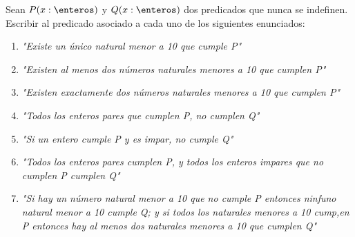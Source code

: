 \begin{enunciado}{\ejercicio}
  Sean $P(x:\enteros)$ y $Q(x: \enteros)$ dos predicados que nunca se indefinen. Escribir al predicado asociado
  a cada uno de los siguientes enunciados:
  \begin{enumerate}[label=\tiny\faIcon{yin-yang}$_{\arabic*}$]
    \item \textit{"Existe un único natural menor a 10 que cumple P"}
    \item \textit{"Existen al menos dos números naturales menores a 10 que cumplen P"}
    \item \textit{"Existen exactamente dos números naturales menores a 10 que cumplen P"}
    \item \textit{"Todos los enteros pares que cumplen P, no cumplen Q"}
    \item \textit{"Si un entero cumple P y es impar, no cumple Q"}
    \item \textit{"Todos los enteros pares cumplen P, y todos los enteros impares que no cumplen P cumplen Q"}
    \item \textit{"Si hay un número natural menor a 10 que no cumple P entonces ninfuno natural menor a 10 cumple Q; y si todos los
            naturales menores a 10 cump,en P entonces hay al menos dos naturales menores a 10 que cumplen Q"}
  \end{enumerate}
\end{enunciado}

